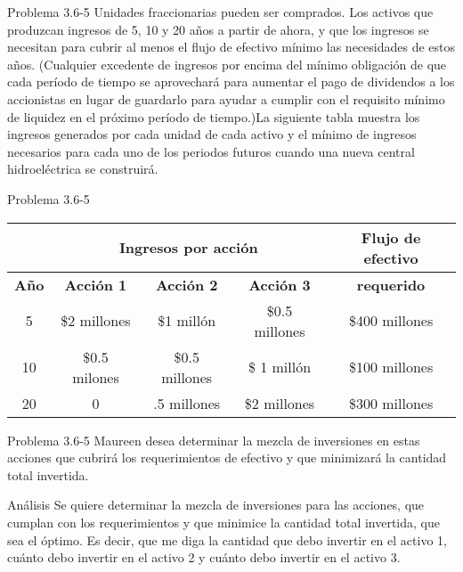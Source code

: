 \documentclass{beamer}
\begin{document}
\begin{frame}[t,fragile]{Problema 3.6-5 }
Unidades fraccionarias pueden ser comprados. Los activos que produzcan ingresos de 5, 10 y 20 años a partir de ahora, y que los ingresos se necesitan para cubrir al menos el flujo de efectivo m\'inimo las necesidades de estos años. (Cualquier excedente de ingresos por encima del m\'inimo obligaci\'on de que cada per\'iodo de tiempo se aprovechar\'a para aumentar el pago de dividendos a los accionistas en lugar de guardarlo para ayudar a cumplir con el requisito m\'inimo de liquidez en el pr\'oximo per\'iodo de tiempo.)La siguiente tabla muestra  los ingresos generados por cada unidad de cada activo y el  m\'inimo de ingresos necesarios para cada uno de los periodos futuros cuando una nueva central hidroel\'ectrica se construir\'a.
\end{frame}
\begin{frame}[t,fragile]{Problema 3.6-5 }
\begin{tabular}{|c|c|c|c|c|}
\hline 
 & \multicolumn{3}{c|}{\textbf{Ingresos por acci\'on}} & \textbf{{Flujo de efectivo} }\\ 
\hline 
\textbf{Año} & \textbf{Acci\'on 1} & \textbf{Acci\'on 2} & \textbf{Acci\'on 3} & \textbf{requerido} \\ 
\hline 
5 & \$2 millones & \$1 mill\'on & \$0.5 millones & \$400 millones \\ 
\hline 
10 & \$0.5 milones & \$0.5 millones & \$ 1 mill\'on & \$100 millones \\ 
\hline 
20 & 0 & \1.5 millones & \$2 millones & \$300 millones \\ 
\hline 
\end{tabular} 
\end{frame}

\begin{frame}[t,fragile]{Problema 3.6-5 }
Maureen desea determinar la mezcla de inversiones en estas acciones que cubrir\'a los requerimientos de efectivo y que minimizar\'a la cantidad total invertida.
\end{frame}

\begin{frame}[fragile]{An\'alisis}
Se quiere determinar la mezcla de inversiones  para las acciones, que cumplan con los requerimientos  y que minimice la cantidad total invertida, que sea el \'optimo. Es decir, que me diga la cantidad que debo invertir en el activo 1, cu\'anto debo invertir en el activo 2 y cu\'anto debo invertir en el activo 3.

\end{frame}
\end{document}
